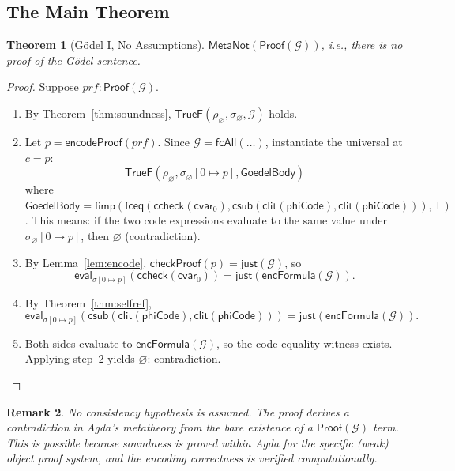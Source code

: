 \documentclass[11pt]{article}
\newtheorem{theorem}{Theorem}[section]
\newtheorem{remark}[theorem]{Remark}
\newcommand{\Proof}{\mathsf{Proof}}
\newcommand{\checkProof}{\mathsf{checkProof}}
\newcommand{\encFormula}{\mathsf{encFormula}}
\newcommand{\csub}{\mathsf{csub}}
\newcommand{\clit}{\mathsf{clit}}
\newcommand{\ccheck}{\mathsf{ccheck}}
\newcommand{\cvar}{\mathsf{cvar}}
\newcommand{\fbot}{\bot}
\newcommand{\fimp}{\mathsf{fimp}}
\newcommand{\fceq}{\mathsf{fceq}}
\newcommand{\fcAll}{\mathsf{fcAll}}
\newcommand{\TrueF}{\mathsf{TrueF}}
\newcommand{\MetaNot}{\mathsf{MetaNot}}
\newcommand{\GS}{\mathcal{G}}
\newcommand{\phiCode}{\mathsf{phiCode}}
\begin{document}
\subsection{The Main Theorem}

\begin{theorem}[G\"odel I, No Assumptions]
  \label{thm:goedel1}
  $\MetaNot(\Proof(\GS))$, i.e., there is no proof of the G\"odel sentence.
\end{theorem}

\begin{proof}
  Suppose $\mathit{prf} : \Proof(\GS)$.
  \begin{enumerate}[nosep]
    \item By Theorem~\ref{thm:soundness},
      $\TrueF(\rho_\varnothing, \sigma_\varnothing, \GS)$ holds.
    \item Let $p = \mathsf{encodeProof}(\mathit{prf})$. Since
      $\GS = \fcAll(\ldots)$, instantiate the universal at $c = p$:
      \[
        \TrueF(\rho_\varnothing, \sigma_\varnothing[0 \mapsto p], \mathsf{GoedelBody})
      \]
      where $\mathsf{GoedelBody} = \fimp(\fceq(\ccheck(\cvar_0), \csub(\clit(\phiCode), \clit(\phiCode))), \fbot)$.
      This means: if the two code expressions evaluate to the same value
      under $\sigma_\varnothing[0 \mapsto p]$, then $\varnothing$ (contradiction).
    \item By Lemma~\ref{lem:encode},
      $\checkProof(p) = \mathsf{just}(\GS)$, so
      \[
        \mathsf{eval}_{\sigma[0\mapsto p]}(\ccheck(\cvar_0))
          = \mathsf{just}(\encFormula(\GS)).
      \]
    \item By Theorem~\ref{thm:selfref},
      \[
        \mathsf{eval}_{\sigma[0\mapsto p]}(\csub(\clit(\phiCode), \clit(\phiCode)))
          = \mathsf{just}(\encFormula(\GS)).
      \]
    \item Both sides evaluate to $\encFormula(\GS)$, so the code-equality
      witness exists. Applying step~2 yields $\varnothing$: contradiction.
      \qedhere
  \end{enumerate}
\end{proof}

\begin{remark}
  No consistency hypothesis is assumed. The proof derives a
  contradiction in Agda's metatheory from the bare existence of a
  $\Proof(\GS)$ term. This is possible because soundness is proved
  \emph{within} Agda for the specific (weak) object proof system,
  and the encoding correctness is verified computationally.
\end{remark}
\end{document}

